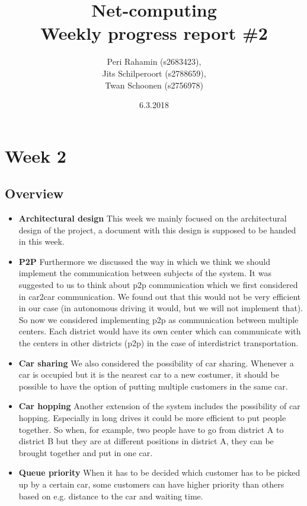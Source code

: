 \documentclass[a4paper]{article}
\begin{document}
\title{Net-computing\\
Weekly progress report \#2
}

\date{6.3.2018}

\author{Peri Rahamin (s2683423),\\
Jits Schilperoort (s2788659),\\
Twan Schoonen (s2756978)
}


\maketitle
\section*{Week 2}
\subsection*{Overview}
\begin{itemize}
	\item \textbf{Architectural design} This week we mainly focused on the architectural design of the project, a document with this design is supposed to be handed in this week.
	\item \textbf{P2P}  Furthermore we discussed the way in which we think we should implement the communication between subjects of the system. It was suggested to us to think about p2p communication which we first considered in car2car communication. We found out that this would not be very efficient in our case (in autonomous driving it would, but we will not implement that). So now we considered implementing p2p as communication between multiple centers. Each district would have its own center which can communicate with the centers in other districts (p2p) in the case of interdistrict transportation.  
	\item \textbf{Car sharing} We also considered the possibility of car sharing. Whenever a car is occupied but it is the nearest car to a new costumer, it should be possible to have the option of putting multiple customers in the same car. 
	\item \textbf{Car hopping} Another extension of the system includes the possibility of car hopping. Especially in long drives it could be more efficient to put people together. So when, for example, two people have to go from district A to district B but they are at different positions in district A, they can be brought together and put in one car.
	\item \textbf{Queue priority} When it has to be decided which customer has to be picked up by a certain car, some customers can have higher priority than others based on e.g. distance to the car and waiting time. 
	
\end{itemize}
\end{document}
